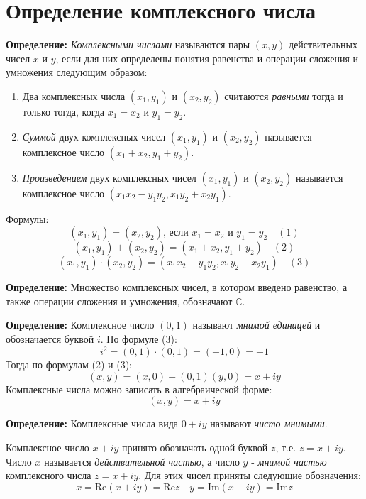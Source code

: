 \section{Определение комплексного
числа}\label{ux43eux43fux440ux435ux434ux435ux43bux435ux43dux438ux435-ux43aux43eux43cux43fux43bux435ux43aux441ux43dux43eux433ux43e-ux447ux438ux441ux43bux430}

\textbf{Определение:} \emph{Комплексными числами} называются пары
\((x,y)\) действительных чисел \(x\) и \(y\), если для них определены
понятия равенства и операции сложения и умножения следующим образом:

\begin{enumerate}
\def\labelenumi{\arabic{enumi}.}
\tightlist
\item
  Два комплексных числа \((x_{1},y_{1})\) и \((x_{2},y_{2})\) считаются
  \emph{равными} тогда и только тогда, когда \(x_{1}=x_{2}\) и
  \(y_{1}=y_{2}\).
\item
  \emph{Суммой} двух комплексных чисел \((x_{1},y_{1})\) и
  \((x_{2},y_{2})\) называется комплексное число
  \((x_{1}+x_{2},y_{1}+y_{2})\).
\item
  \emph{Произведением} двух комплексных чисел \((x_{1},y_{1})\) и
  \((x_{2},y_{2})\) называется комплексное число
  \((x_{1}x_{2}-y_{1}y_{2},x_{1}y_{2}+x_{2}y_{1})\).
\end{enumerate}

Формулы: \[
(x_{1},y_{1})=(x_{2},y_{2})\text{, если } x_{1}=x_{2}\text{ и }y_{1}=y_{2}\quad(1)
\] \[
(x_{1},y_{1})+(x_{2},y_{2})=(x_{1}+x_{2},y_{1}+y_{2})\quad(2)
\] \[
(x_{1},y_{1})\cdot(x_{2},y_{2})=(x_{1}x_{2}-y_{1}y_{2},x_{1}y_{2}+x_{2}y_{1})\quad(3)
\]

\textbf{Определение:} Множество комплексных чисел, в котором введено
равенство, а также операции сложения и умножения, обозначают
\(\mathbb{C}\).

\textbf{Определение:} Комплексное число \((0,1)\) называют \emph{мнимой
единицей} и обозначается буквой \(i\). По формуле (3): \[
i^{2}=(0,1)\cdot(0,1)=(-1,0)=-1
\] Тогда по формулам (2) и (3): \[
(x,y)=(x,0)+(0,1)(y,0)=x+iy
\] Комплексные числа можно записать в алгебраической форме: \[
(x,y)=x+iy
\]

\textbf{Определение:} Комплексные числа вида \(0+iy\) называют
\emph{чисто мнимыми}.

Комплексное число \(x+iy\) принято обозначать одной буквой \(z\), т.е.
\(z=x+iy\). Число \(x\) называется \emph{действительной частью}, а число
\(y\) - \emph{мнимой частью} комплексного числа \(z=x+iy\). Для этих
чисел приняты следующие обозначения: \[
x=\mathrm{Re}(x+iy)=\mathrm{Re}z\quad y=\mathrm{Im}(x+iy)=\mathrm{Im}z
\]

